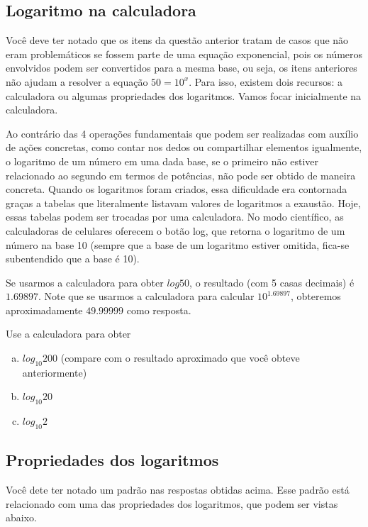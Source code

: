 \documentclass[main_estudante.tex]{subfiles}
\begin{document}
\subsection*{Logaritmo na calculadora}

Você deve ter notado que os itens da questão anterior tratam de casos que não eram problemáticos se fossem parte de uma equação exponencial, pois os números envolvidos podem ser convertidos para a mesma base, ou seja, os itens anteriores não ajudam a resolver a equação $50=10^x$. Para isso, existem dois recursos: a calculadora ou algumas propriedades dos logaritmos. Vamos focar inicialmente na calculadora.

Ao contrário das 4 operações fundamentais que podem ser realizadas com auxílio de ações concretas, como contar nos dedos ou compartilhar elementos igualmente, o logaritmo de um número em uma dada base, se o primeiro não estiver relacionado ao segundo em termos de potências, não pode ser obtido de maneira concreta. Quando os logaritmos foram criados, essa dificuldade era contornada graças a tabelas que literalmente listavam valores de logaritmos a exaustão. Hoje, essas tabelas podem ser trocadas por uma calculadora. No modo científico, as calculadoras de celulares oferecem o botão log, que retorna o logaritmo de um número na base 10 (sempre que a base de um logaritmo estiver omitida, fica-se subentendido que a base é 10).

Se usarmos a calculadora para obter $log 50$, o resultado (com 5 casas decimais) é $1.69897$. Note que se usarmos a calculadora para calcular $10^1.69897$, obteremos aproximadamente $49.99999$ como resposta.

\begin{questao}
Use a calculadora para obter
\begin{enumerate}[a)]
\item $log_{10} 200$ (compare com o resultado aproximado que você obteve anteriormente)
\item $log_{10} 20$
\item $log_{10} 2$
\end{enumerate}
\end{questao}

\subsection*{Propriedades dos logaritmos}

Você dete ter notado um padrão nas respostas obtidas acima. Esse padrão está relacionado com uma das propriedades dos logaritmos, que podem ser vistas abaixo.
\end{document}
